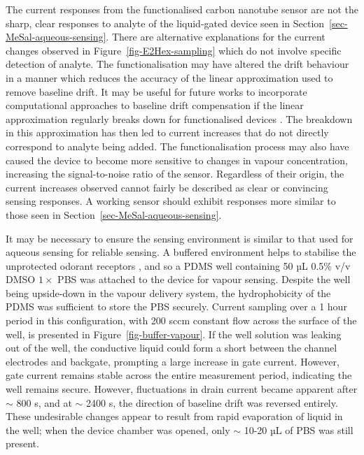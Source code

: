 \documentclass[
  a4paper,
]{scrbook}
\begin{document}
The current responses from the functionalised carbon nanotube sensor are
not the sharp, clear responses to analyte of the liquid-gated device
seen in Section~\ref{sec-MeSal-aqueous-sensing}. There are alternative
explanations for the current changes observed in
Figure~\ref{fig-E2Hex-sampling} which do not involve specific detection
of analyte. The functionalisation may have altered the drift behaviour
in a manner which reduces the accuracy of the linear approximation used
to remove baseline drift. It may be useful for future works to
incorporate computational approaches to baseline drift compensation if
the linear approximation regularly breaks down for functionalised
devices \autocite{Zhang2022}. The breakdown in this approximation has
then led to current increases that do not directly correspond to analyte
being added. The functionalisation process may also have caused the
device to become more sensitive to changes in vapour concentration,
increasing the signal-to-noise ratio of the sensor. Regardless of their
origin, the current increases observed cannot fairly be described as
clear or convincing sensing responses. A working sensor should exhibit
responses more similar to those seen in
Section~\ref{sec-MeSal-aqueous-sensing}.

It may be necessary to ensure the sensing environment is similar to that
used for aqueous sensing for reliable sensing. A buffered environment
helps to stabilise the unprotected odorant receptors
\autocite{Sato2014}, and so a PDMS well containing 50 µL 0.5\% v/v DMSO
\(1 \times\) PBS was attached to the device for vapour sensing. Despite
the well being upside-down in the vapour delivery system, the
hydrophobicity of the PDMS was sufficient to store the PBS securely.
Current sampling over a 1 hour period in this configuration, with 200
sccm constant flow across the surface of the well, is presented in
Figure~\ref{fig-buffer-vapour}. If the well solution was leaking out of
the well, the conductive liquid could form a short between the channel
electrodes and backgate, prompting a large increase in gate current.
However, gate current remains stable across the entire measurement
period, indicating the well remains secure. However, fluctuations in
drain current became apparent after \(\sim\) 800 s, and at \(\sim\) 2400
s, the direction of baseline drift was reversed entirely. These
undesirable changes appear to result from rapid evaporation of liquid in
the well; when the device chamber was opened, only \(\sim\) 10-20 µL of
PBS was still present.
\end{document}
